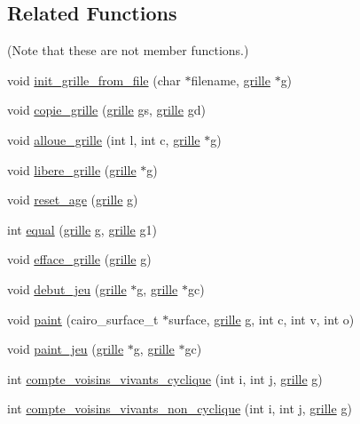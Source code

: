 \subsection*{Related Functions}
(Note that these are not member functions.) \begin{DoxyCompactItemize}
\item 
void \hyperlink{structgrille_adf5501cc0bbad28f5ffc561d92197e4e}{init\+\_\+grille\+\_\+from\+\_\+file} (char $\ast$filename, \hyperlink{structgrille}{grille} $\ast$g)
\item 
void \hyperlink{structgrille_a63b3ae16c86b568f6aa8f9ce84128b1e}{copie\+\_\+grille} (\hyperlink{structgrille}{grille} gs, \hyperlink{structgrille}{grille} gd)
\item 
void \hyperlink{structgrille_ae621f51c60aa4fafaa0c9f6c9b5a4036}{alloue\+\_\+grille} (int l, int c, \hyperlink{structgrille}{grille} $\ast$g)
\item 
void \hyperlink{structgrille_a7074b2b15576e9d2b3cd15c3a1dc7012}{libere\+\_\+grille} (\hyperlink{structgrille}{grille} $\ast$g)
\item 
void \hyperlink{structgrille_ad6aeeb248a6f53c4eb4816fbe5c96d79}{reset\+\_\+age} (\hyperlink{structgrille}{grille} g)
\item 
int \hyperlink{structgrille_af1f17157017c70a08cd7f7b09f7152ec}{equal} (\hyperlink{structgrille}{grille} g, \hyperlink{structgrille}{grille} g1)
\item 
void \hyperlink{structgrille_ab36a6f8957cd3e682119007836ce6ad5}{efface\+\_\+grille} (\hyperlink{structgrille}{grille} g)
\item 
void \hyperlink{structgrille_a88493b3c55828670e47150a95ed7db5b}{debut\+\_\+jeu} (\hyperlink{structgrille}{grille} $\ast$g, \hyperlink{structgrille}{grille} $\ast$gc)
\item 
void \hyperlink{structgrille_ae3ed00766fde31afac2a91e473f02ac5}{paint} (cairo\+\_\+surface\+\_\+t $\ast$surface, \hyperlink{structgrille}{grille} g, int c, int v, int o)
\item 
void \hyperlink{structgrille_aa612c5d2c307343e977b7097b81be3e7}{paint\+\_\+jeu} (\hyperlink{structgrille}{grille} $\ast$g, \hyperlink{structgrille}{grille} $\ast$gc)
\item 
int \hyperlink{structgrille_a919a35926d94b71717909ecc50233f26}{compte\+\_\+voisins\+\_\+vivants\+\_\+cyclique} (int i, int j, \hyperlink{structgrille}{grille} g)
\item 
int \hyperlink{structgrille_a2e8fdd206d197391527920bbbc137eef}{compte\+\_\+voisins\+\_\+vivants\+\_\+non\+\_\+cyclique} (int i, int j, \hyperlink{structgrille}{grille} g)

\end{DoxyCompactItemize}
